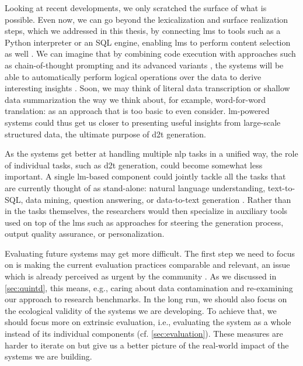 Looking at recent developments, we only scratched the surface of what is possible. Even now, we can go beyond the lexicalization and surface realization steps, which we addressed in this thesis, by connecting \acp{lm} to tools such as a Python interpreter or an SQL engine, enabling \acp{lm} to perform content selection as well \cite{cao-etal-2023-api,jiang-etal-2023-structgpt,gemmell2023generate}. We can imagine that by combining code execution with approaches such as chain-of-thought prompting and its advanced variants \cite{weiChainThoughtPrompting2022,chu2023survey}, the systems will be able to automatically perform logical operations over the data to derive interesting insights \cite{zhao-etal-2023-qtsumm,chenLogicalNaturalLanguage2020,chenLogic2TextHighFidelityNatural2020}. Soon, we may think of literal data transcription or shallow data summarization the way we think about, for example, word-for-word translation: as an approach that is too basic to even consider. \ac{lm}-powered systems could thus get us closer to presenting useful insights from large-scale structured data, the ultimate purpose of \ac{d2t} generation.

As the systems get better at handling multiple \ac{nlp} tasks in a unified way, the role of individual tasks, such as \ac{d2t} generation, could become somewhat less important. A single \ac{lm}-based component could jointly tackle all the tasks that are currently thought of as stand-alone: natural language understanding, text-to-SQL, data mining, question answering, or data-to-text generation \cite{schopf-etal-2023-exploring,chen2024multi}. Rather than in the tasks themselves, the researchers would then specialize in auxiliary tools used on top of the \acp{lm} such as approaches for steering the generation process, output quality assurance, or personalization.


Evaluating future systems may get more difficult. The first step we need to focus on is making the current evaluation practices comparable and relevant, an issue which is already perceived as urgent by the community \cite{gehrmannRepairingCrackedFoundation2022,van_miltenburg_barriers_2023}.  As we discussed in \autoref{sec:quintd}, this means, e.g., caring about data contamination and re-examining our approach to research benchmarks. In the long run, we should also focus on the ecological validity of the systems we are developing. To achieve that, we should focus more on extrinsic evaluation, i.e., evaluating the system as a whole instead of its individual components (cf. \autoref{sec:evaluation}). These measures are harder to iterate on but give us a better picture of the real-world impact of the systems we are building.

